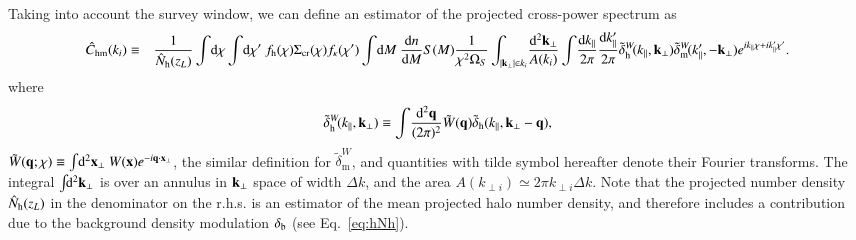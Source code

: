 \documentclass[onecolumn,notitlepage,showpacs,amsmath,amssymb,prd,floatfix]{revtex4-1}
\newcommand{\bx}{{\bf x}}
\newcommand{\bk}{{\bf k}}
\newcommand{\bq}{{\bf q}}
\newcommand{\tW}{\tilde{W}}
\newcommand{\dr}{\mathrm{d}}
\newcommand{\deltab}{\delta_{\rm b}}
\newcommand{\tdeltam}{\tilde{\delta}_{\mathrm{m}}}
\newcommand{\hchm}{\hat{C}_{\mathrm{hm}}}
\newcommand{\bh}{\mathrm{h}}
\newcommand{\bnh}{\frac{\dr n}{\dr M}}
\newcommand{\sigmacr}{\Sigma_{\rm cr}}
\newcommand{\hNh}{\hat{N}_{\rm h}}
\newcommand{\tdeltah}{\tilde{\delta}_{\rm h}}
\begin{document}
Taking into account the survey window, we can define an estimator of the
projected cross-power spectrum as
%
\begin{eqnarray}
 \hchm(k_i)&\equiv & \frac{1}{\hNh(z_L)}\int\!\dr\chi\int\!\dr\chi'~f_\bh(\chi)
  \sigmacr(\chi)
  f_\kappa(\chi')\int\!\dr M~\bnh S(M)
  \frac{1}{\chi^2\Omega_S}
  \int_{|\bk_\perp|\in k_i}\!\frac{\dr^2\bk_\perp}{A(k_i)}\int\!\frac{\dr k_\parallel}{2\pi}
  \frac{\dr k^{\prime }_\parallel}{2\pi}
  \tdeltah^W\!(k_\parallel,\bk_\perp)\tdeltam^W\!(k'_\parallel,-\bk_\perp)
  e^{ik_\parallel\chi+ ik'_\parallel\chi'}.\nonumber\\
\label{eq:e_chm}
\end{eqnarray}
%
where 
%
\begin{equation}
  \tdeltah^W\!(k_\parallel,\bk_\perp)\equiv 
  \int\!\frac{\dr^2\bq}{(2\pi)^2}\tW(\bq)
  \tdeltah(k_\parallel,\bk_\perp-\bq),
\end{equation}
%
$\tW(\bq;\chi)\equiv
\int\!\dr^2\bx_\perp~W(\bx)e^{-i\bq\cdot\bx_\perp}$, the similar
definition for $\tdeltam^W$, and quantities with tilde symbol hereafter
denote their Fourier transforms. The integral $\int\!\!\dr^2\bk_\perp$
is over an annulus in $\bk_\perp$ space of width $\Delta k$, and the
area $A(k_{\perp i})\simeq 2\pi k_{\perp i}\Delta k$.  Note that the
projected number density $\hNh(z_L)$ in the denominator on the r.h.s. is
an estimator of the mean projected halo number density, and therefore
includes a contribution due to the background density modulation
$\deltab$ (see Eq.~\ref{eq:hNh}).
\end{document}
